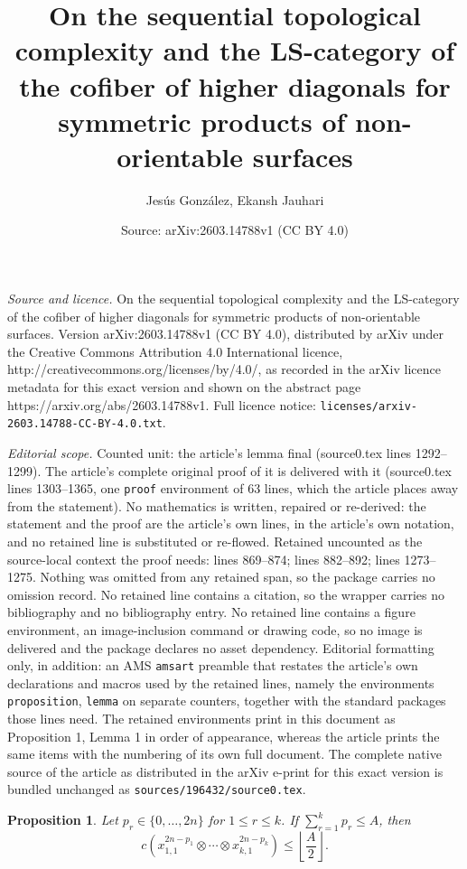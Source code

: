 \documentclass[10pt,a4paper]{amsart}
\title{On the sequential topological complexity and the LS-category of the cofiber of higher diagonals for symmetric products of non-orientable surfaces}
\author{Jes\'us Gonz\'alez, Ekansh Jauhari}
\date{Source: arXiv:2603.14788v1 (CC BY 4.0)}
\newtheorem{proposition}{Proposition}
\begin{document}
\maketitle

\noindent\emph{Source and licence.} On the sequential topological complexity and the LS-category of the cofiber of higher diagonals for symmetric products of non-orientable surfaces. Version arXiv:2603.14788v1 (CC BY 4.0), distributed by arXiv under the Creative Commons Attribution 4.0 International licence, http://creativecommons.org/licenses/by/4.0/, as recorded in the arXiv licence metadata for this exact version and shown on the abstract page https://arxiv.org/abs/2603.14788v1. Full licence notice: \texttt{licenses/arxiv-2603.14788-CC-BY-4.0.txt}.\par\smallskip

\noindent\textit{Editorial scope.} Counted unit: the article's lemma final (source0.tex lines 1292--1299). The article's complete original proof of it is delivered with it (source0.tex lines 1303--1365, one \texttt{proof} environment of 63 lines, which the article places away from the statement). No mathematics is written, repaired or re-derived: the statement and the proof are the article's own lines, in the article's own notation, and no retained line is substituted or re-flowed.  Retained uncounted as the source-local context the proof needs: lines 869--874; lines 882--892; lines 1273--1275.  Nothing was omitted from any retained span, so the package carries no omission record.  No retained line contains a citation, so the wrapper carries no bibliography and no bibliography entry.  No retained line contains a figure environment, an image-inclusion command or drawing code, so no image is delivered and the package declares no asset dependency.  Editorial formatting only, in addition: an AMS \texttt{amsart} preamble that restates the article's own declarations and macros used by the retained lines, namely the environments \texttt{proposition}, \texttt{lemma} on separate counters, together with the standard packages those lines need.  The retained environments print in this document as Proposition 1, Lemma 1 in order of appearance, whereas the article prints the same items with the numbering of its own full document.  The complete native source of the article as distributed in the arXiv e-print for this exact version is bundled unchanged as \texttt{sources/196432/source0.tex}.
\begin{proposition}\label{prop: prop y from notes}
Let $p_{r}\in\{0,\ldots, 2n\}$ for $1\le r \le k$. If $\sum_{r=1}^kp_r\le A$, then
\[
c\left(x_{1,1}^{2n-p_1}\otimes\cdots\otimes x_{k,1}^{2n-p_k}\right)\le\left\lfloor\frac{A}{2}\right\rfloor.
\]
\end{proposition}
\end{document}
